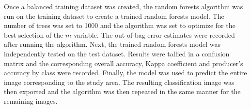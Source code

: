 \justify
Once a balanced training dataset was created, the random forests algorithm was run on the training dataset to create a trained random forests model. The number of trees was set to 1000 and the algorithm was set to optimize for the best selection of the $m$ variable. The out-of-bag error estimates were recorded after running the algorithm. Next, the trained random forests model was independently tested on the test dataset. Results were tallied in a confusion matrix and the corresponding overall accuracy, Kappa coefficient and producer's accuracy by class were recorded. Finally, the model was used to predict the entire image corresponding to the study area. The resulting classification image was then exported and the algorithm was then repeated in the same manner for the remaining images.

\vspace{5pt}
